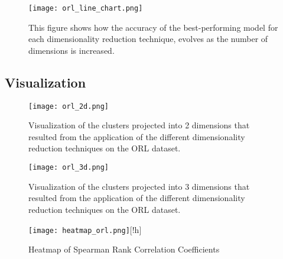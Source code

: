 \begin{figure}[!h]
    \centering
    \texttt{[image: orl\_line\_chart.png]}
    \caption{This figure shows how the accuracy of the best-performing model for each dimensionality reduction technique, evolves as the number of dimensions is increased.}
    \label{fig:orl_line_chart}
\end{figure}

\subsection{Visualization}

\begin{figure}[!h]
    \centering
    \texttt{[image: orl\_2d.png]}
    \caption{Visualization of the clusters projected into 2 dimensions that resulted from the application of the different dimensionality reduction techniques on the ORL dataset.}
    \label{fig:orl-2d}
\end{figure}

\begin{figure}[!h]
    \centering
    \texttt{[image: orl\_3d.png]}
    \caption{Visualization of the clusters projected into 3 dimensions that resulted from the application of the different dimensionality reduction techniques on the ORL dataset.}
    \label{fig:orl-3d}
\end{figure}

\begin{figure}
    \centering
    \texttt{[image: heatmap\_orl.png]}[!h]
    \caption{Heatmap of Spearman Rank Correlation Coefficients}
    \label{fig:heatmap-orl}
\end{figure}

